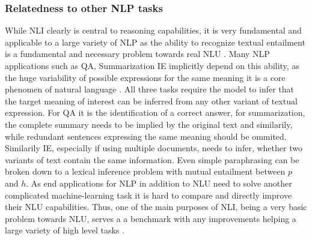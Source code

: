 \subsubsection*{Relatedness to other NLP tasks}
While \ac{NLI} clearly is central to reasoning capabilities, it is very fundamental and applicable to a large variety of \ac{NLP} as the ability to recognize textual entailment is a fundamental and necessary problem towards real \ac{NLU} \citep{maccartney2007natural,bos2005recognising}. Many \ac{NLP} applications such as \ac{QA}, Summarization \ac{IE} implicitly depend on this ability, as the huge variability of possible expressions for the same meaning it is a core phenomen of natural language \citep{dagan2009recognizing}. All three tasks require the model to infer that the target meaning of interest can be inferred from any other variant of textual expression. For \ac{QA} it is the identification of a correct answer, for summarization, the complete summary needs to be implied by the original text and similarily, while redundant sentences expressing the same meaning should be ommited. Similarily \ac{IE}, especially if using multiple documents, needs to infer, whether two variants of text contain the same information. Even simple paraphrasing can be broken down to a lexical inference problem with mutual entailment between $p$ and $h$. As end applications for \ac{NLP} in addition to \ac{NLU} need to solve another complicated machine-learning task it is hard to compare and directly improve their \ac{NLU} capabilities. Thus, one of the main purposes of \ac{NLI}, being a very basic problem towards \ac{NLU}, serves a a benchmark  with any improvements helping a large variety of high level tasks \citep{williams2017broad,cooper1996using,bos2005recognising,dagan2006pascal}. 


